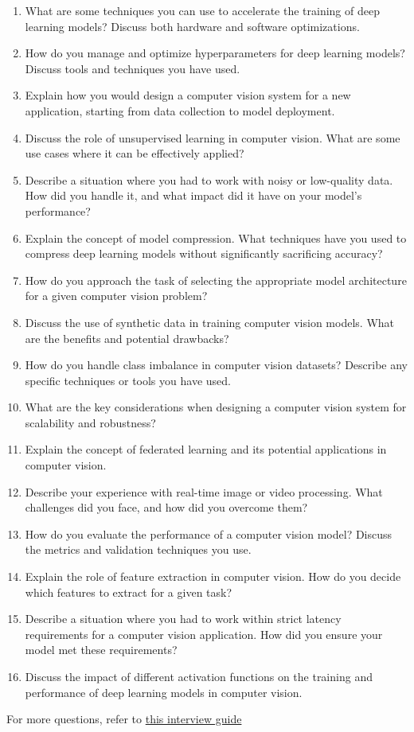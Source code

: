 \documentclass[12pt]{article}
\begin{document}
\begin{enumerate}
    \item What are some techniques you can use to accelerate the training of deep learning models? Discuss both hardware and software optimizations.
    \item How do you manage and optimize hyperparameters for deep learning models? Discuss tools and techniques you have used.
    \item Explain how you would design a computer vision system for a new application, starting from data collection to model deployment.
    \item Discuss the role of unsupervised learning in computer vision. What are some use cases where it can be effectively applied?
    \item Describe a situation where you had to work with noisy or low-quality data. How did you handle it, and what impact did it have on your model's performance?
    \item Explain the concept of model compression. What techniques have you used to compress deep learning models without significantly sacrificing accuracy?
    \item How do you approach the task of selecting the appropriate model architecture for a given computer vision problem?
    \item Discuss the use of synthetic data in training computer vision models. What are the benefits and potential drawbacks?
    \item How do you handle class imbalance in computer vision datasets? Describe any specific techniques or tools you have used.
    \item What are the key considerations when designing a computer vision system for scalability and robustness?
    \item Explain the concept of federated learning and its potential applications in computer vision.
    \item Describe your experience with real-time image or video processing. What challenges did you face, and how did you overcome them?
    \item How do you evaluate the performance of a computer vision model? Discuss the metrics and validation techniques you use.
    \item Explain the role of feature extraction in computer vision. How do you decide which features to extract for a given task?
    \item Describe a situation where you had to work within strict latency requirements for a computer vision application. How did you ensure your model met these requirements?
    \item Discuss the impact of different activation functions on the training and performance of deep learning models in computer vision.

\end{enumerate}

For more questions, refer to \href{https://www.projectpro.io/article/computer-vision-engineer-interview-questions/450}{this interview guide}
\end{document}
